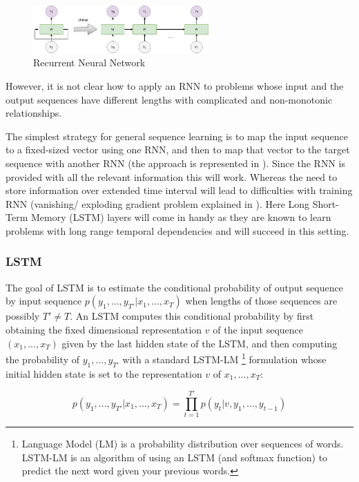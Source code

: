 \begin{figure}[h]
	\centering
	\includegraphics[width=0.6\textwidth]{img/RNN.png}
	\caption{\label{fig:RNN}Recurrent Neural Network}
\end{figure}
 
However, it is not clear how to apply an RNN to problems whose input and the output sequences have different lengths with complicated and non-monotonic relationships.

The simplest strategy for general sequence learning is to map the input sequence to a fixed-sized
vector using one RNN, and then to map that vector to the target sequence with another RNN (the
approach is represented in \cite{baseline_NMT}). Since the RNN is provided with all the relevant information this will work. Whereas the need to store information over extended time interval will lead to difficulties with training RNN (vanishing/ exploding gradient problem explained in \cite{LSTM_baseline}).
Here Long Short-Term Memory (LSTM) layers will come in handy as they are known to learn problems with long range temporal dependencies and will succeed in this setting.

\subsubsection{LSTM}

The goal of LSTM is to estimate the conditional probability of output sequence by input sequence $p(y_1, ..., y_{T′}|x_1, ..., x_T )$ when lengths of those sequences are possibly $T' \neq T$. 
An LSTM computes this conditional probability by first obtaining the fixed dimensional
representation $v$ of the input sequence $(x_1, ..., x_T)$ given by the last hidden state of the LSTM, and then computing the probability of $y_1, ..., y_{T′}$ with a standard LSTM-LM
\footnote{Language Model (LM) is a probability distribution over sequences of words. LSTM-LM is an algorithm of using an LSTM (and softmax function) to predict the next word given your previous words.} 
formulation whose initial hidden state is set to the representation $v$ of  $x_1, ..., x_T$:

$$p(y_1, ..., y_{T′}|x_1, ..., x_T ) = \prod_{t=1}^{T'} p(y_t|v, y_1, ..., y_{t-1}) $$


